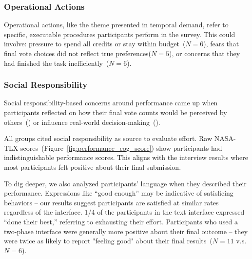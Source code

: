 \subsubsection{Operational Actions}
Operational actions, like the theme presented in temporal demand, refer to specific, executable procedures participants perform in the survey. This could involve: pressure to spend all credits or stay within budget~($N=6$), fears that final vote choices did not reflect true preferences($N=5$), or concerns that they had finished the task inefficiently~($N=6$).


\subsubsection{Social Responsibility}
Social responsibility-based concerns around performance came up when participants reflected on how their final vote counts would be perceived by others~() or influence real-world decision-making~().

All groups cited social responsibility as source to evaluate effort. Raw NASA-TLX scores~(Figure~\ref{fig:performance_cog_score}) show participants had indistinguishable performance scores. This aligns with the interview results where most participants felt positive about their final submission. 

To dig deeper, we also analyzed participants' language when they described their performance. Expressions like ``good enough'' may be indicative of satisficing behaviors -- our results suggest participants are satisfied at similar rates regardless of the interface. 1/4 of the participants in the text interface expressed ``done their best,'' referring to exhausting their effort. Participants who used a two-phase interface were generally more positive about their final outcome -- they were twice as likely to report "feeling good" about their final results~($N=11$ v.s. $N=6$).

